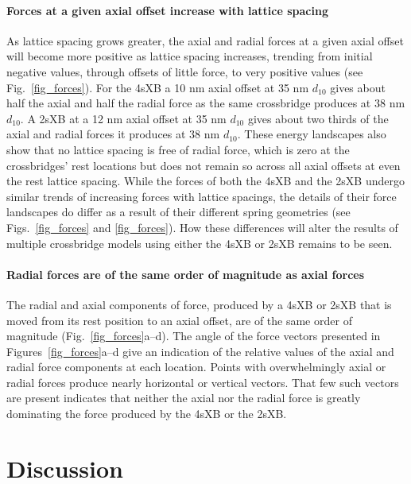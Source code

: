 \documentclass[]{article}
\begin{document}
\paragraph{Forces at a given axial offset increase with lattice spacing} %
As lattice spacing grows greater, the axial and radial forces at a given axial offset will become more positive as lattice spacing increases, trending from initial negative values, through offsets of little force, to very positive values (see Fig.\ \ref{fig_forces}). 
For the 4sXB a 10 nm axial offset at 35 nm $d_{10}$ gives about half the axial and half the radial force as the same crossbridge produces at 38 nm $d_{10}$. 
A 2sXB at a 12 nm axial offset at 35 nm $d_{10}$ gives about two thirds of the axial and radial forces it produces at 38 nm $d_{10}$. 
These energy landscapes also show that no lattice spacing is free of radial force, which is zero at the crossbridges' rest locations but does not remain so across all axial offsets at even the rest lattice spacing. 
While the forces of both the 4sXB and the 2sXB undergo similar trends of increasing forces with lattice spacings, the details of their force landscapes do differ as a result of their different spring geometries (see Figs.\ \ref{fig_forces} and \ref{fig_forces}). 
How these differences will alter the results of multiple crossbridge models using either the 4sXB or 2sXB remains to be seen. 


\paragraph{Radial forces are of the same order of magnitude as axial forces} %
The radial and axial components of force, produced by a 4sXB or 2sXB that is moved from its rest position to an axial offset, are of the same order of magnitude (Fig.\ \ref{fig_forces}a--d). 
The angle of the force vectors presented in Figures~\ref{fig_forces}a--d give an indication of the relative values of the axial and radial force components at each location.
Points with overwhelmingly axial or radial forces produce nearly horizontal or vertical vectors.
That few such vectors are present indicates that neither the axial nor the radial force is greatly dominating the force produced by the 4sXB or the 2sXB.



\section{Discussion} %
\end{document}
